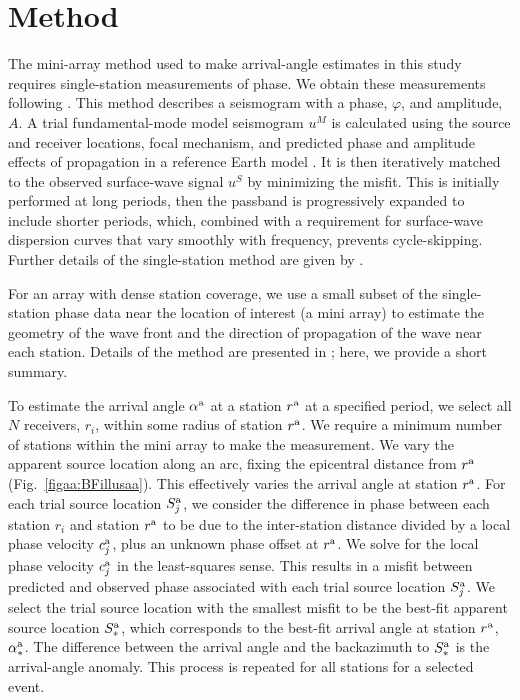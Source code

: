 \documentclass[12pt,oneside]{book}
\begin{document}
\section{Method}

The mini-array method used to make arrival-angle estimates in this study requires single-station measurements of phase. We obtain these measurements following \citet{Ekstrom1997}. This method describes a seismogram with a phase, $\varphi$, and amplitude, $A$. A trial fundamental-mode model seismogram $u^M$ is calculated using the source and receiver locations, focal mechanism, and predicted phase and amplitude effects of propagation in a reference Earth model \citep[SH8U4L8;][]{DziewonskiWoodward1992}. It is then iteratively matched to the observed surface-wave signal $u^S$ by minimizing the misfit. This is initially performed at long periods, then the passband is progressively expanded to include shorter periods, which, combined with a requirement for surface-wave dispersion curves that vary smoothly with frequency, prevents cycle-skipping. Further details of the single-station method are given by \citet{Ekstrom1997}. 

For an array with dense station coverage, we use a small subset of the single-station phase data near the location of interest (a mini array) to estimate the geometry of the wave front and the direction of propagation of the wave near each station. Details of the method are presented in \citet{Fosteretal2014}; here, we provide a short summary.  

To estimate the arrival angle $\alpha^{\rm{a}}$ at a station $r^{\rm{a}}$ at a specified period, we select all $N$ receivers, $r_i$, within some radius of station $r^{\rm{a}}$. We require a minimum number of stations within the mini array to make the measurement. We vary the apparent source location along an arc, fixing the epicentral distance from $r^{\rm{a}}$ (Fig.~\ref{figaa:BFillusaa}). This effectively varies the arrival angle at station $r^{\rm{a}}$. For each trial source location $S^{\rm{a}}_j$, we consider the difference in phase between each station $r_i$ and station $r^{\rm{a}}$ to be due to the inter-station distance divided by a local phase velocity $c^{\rm{a}}_j$, plus an unknown phase offset at $r^{\rm{a}}$. We solve for the local phase velocity $c^{\rm{a}}_j$ in the least-squares sense. This results in a misfit between predicted and observed phase associated with each trial source location $S^{\rm{a}}_j$. We select the trial source location with the smallest misfit to be the best-fit apparent source location $S^{\rm{a}}_{\ast}$, which corresponds to the best-fit arrival angle at station $r^{\rm{a}}$, $\alpha^{\rm{a}}_{\ast}$. The difference between the arrival angle and the backazimuth to $S^{\rm{a}}_{\ast}$ is the arrival-angle anomaly. This process is repeated for all stations for a selected event. 
	
\end{document}

